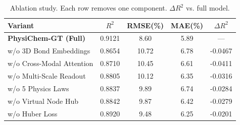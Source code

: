 \begin{table}[htbp]
\centering
\caption{Ablation study. Each row removes one component. $\Delta R^2$ vs. full model.}
\label{tab:ablation}
\begin{tabular}{lcccc}
\toprule
Variant & $R^2$ & RMSE(\%) & MAE(\%) & $\Delta R^2$ \\
\midrule
\textbf{PhysiChem-GT (Full)} & 0.9121 & 8.60 & 5.89 & --- \\
w/o 3D Bond Embeddings & 0.8654 & 10.72 & 6.78 & -0.0467 \\
w/o Cross-Modal Attention & 0.8710 & 10.45 & 6.61 & -0.0411 \\
w/o Multi-Scale Readout & 0.8805 & 10.12 & 6.35 & -0.0316 \\
w/o 5 Physics Laws & 0.8837 & 9.89 & 6.74 & -0.0284 \\
w/o Virtual Node Hub & 0.8842 & 9.87 & 6.42 & -0.0279 \\
w/o Huber Loss & 0.8920 & 9.48 & 6.25 & -0.0201 \\
\bottomrule
\end{tabular}
\end{table}

